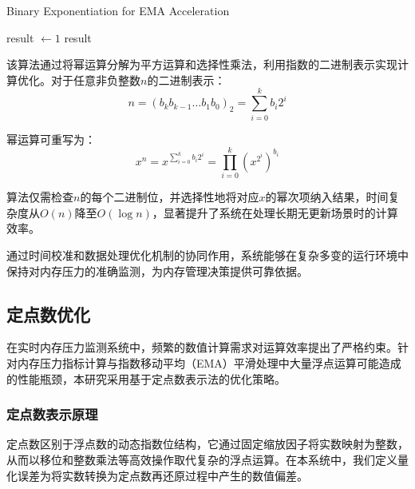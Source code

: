 \begin{algorithm}[htbp]
    \caption{Binary Exponentiation for EMA Acceleration}
    \label{alg:fast_exp}
    \SetAlgoLined
    
    
    result \(\gets 1\)\;
    \Return result\;
\end{algorithm}

该算法通过将幂运算分解为平方运算和选择性乘法，利用指数的二进制表示实现计算优化。对于任意非负整数\(n\)的二进制表示：
\begin{equation}
n = (b_k b_{k-1} \ldots b_1 b_0)_2 = \sum_{i=0}^{k} b_i 2^i
\end{equation}

幂运算可重写为：
\begin{equation}
x^n = x^{\sum_{i=0}^{k} b_i 2^i} = \prod_{i=0}^k (x^{2^i})^{b_i}
\end{equation}

算法仅需检查\(n\)的每个二进制位，并选择性地将对应\(x\)的幂次项纳入结果，时间复杂度从\(O(n)\)降至\(O(\log n)\)，显著提升了系统在处理长期无更新场景时的计算效率。

通过时间校准和数据处理优化机制的协同作用，系统能够在复杂多变的运行环境中保持对内存压力的准确监测，为内存管理决策提供可靠依据。


\subsection{定点数优化}
\label{sec:fixed_point_optimization}

在实时内存压力监测系统中，频繁的数值计算需求对运算效率提出了严格约束。针对内存压力指标计算与指数移动平均（EMA）平滑处理中大量浮点运算可能造成的性能瓶颈，本研究采用基于定点数表示法的优化策略。

\subsubsection{定点数表示原理}

定点数区别于浮点数的动态指数位结构，它通过固定缩放因子将实数映射为整数，从而以移位和整数乘法等高效操作取代复杂的浮点运算。在本系统中，我们定义量化误差为将实数转换为定点数再还原过程中产生的数值偏差。

